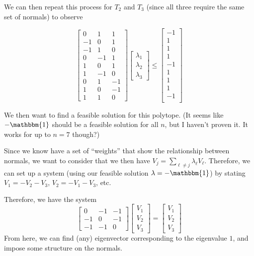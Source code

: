 \documentclass[12pt]{article}
\newcommand{\ones}{\mathbbm{1}}
\begin{document}
  We can then repeat this process for $T_2$ and $T_3$ (since all three require the same set of normals) to observe
  
    \[
    \begin{bmatrix}
        0 & 1 & 1      \\
        -1 & 0 & 1 \\
        -1 & 1 & 0 \\ \hline
        0 & -1 & 1\\
        1 & 0 & 1\\
        1 & -1 & 0\\ \hline
        0 & 1 & -1\\
        1 & 0 &-1 \\
        1 & 1 & 0     
    \end{bmatrix}
    \begin{bmatrix}
        \lambda_1\\
        \lambda_2\\
        \lambda_3
    \end{bmatrix}
    \leq 
    \begin{bmatrix}
        -1\\
        1 \\
        1 \\ \hline
        1 \\
        -1 \\
        1\\ \hline
        1\\
        1\\
        -1\\
    \end{bmatrix} 
    \]
    
    We then want to find a feasible solution for this polytope.
    (It seems like $-\ones$ should be a feasible solution for all $n$, but I haven't proven it.  It works for up to $n=7$ though?)
    
    Since we know have a set of ``weights'' that show the relationship between normals, we want to consider that we then have $V_j = \sum_{\ell \neq j}\lambda_\ell V_\ell.$
    Therefore, we can set up a system (using our feasible solution $\lambda = -\ones$) by stating $V_1 = -V_2 - V_3$, $V_2 = -V_1 - V_3$, etc.
    
    Therefore, we have the system
    \[
    \begin{bmatrix}
        0 & -1 & -1\\
        -1 & 0 & -1 \\
        -1 & -1 & 0
    \end{bmatrix}
    \begin{bmatrix}
        V_1\\
        V_2\\
        V_3
    \end{bmatrix}
    =
    \begin{bmatrix}
        V_1\\
        V_2 \\
        V_3 
    \end{bmatrix} 
    \]
    From here, we can find (any) eigenvector corresponding to the eigenvalue $1$, and impose some structure on the normals.
    
\end{document}

